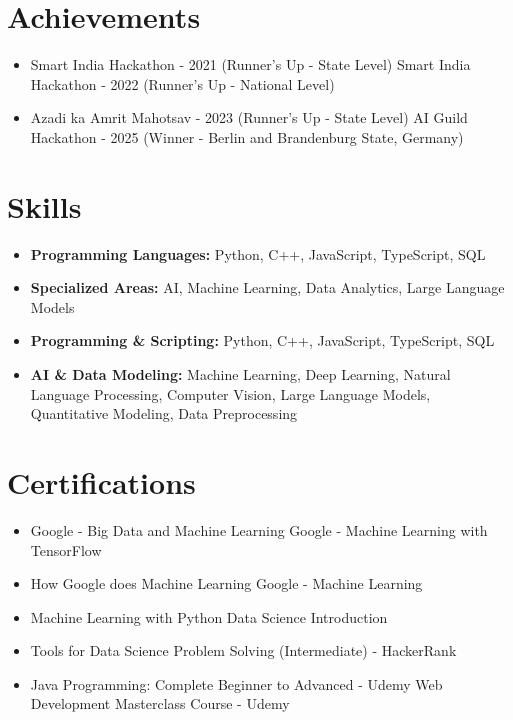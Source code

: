 \documentclass[a4paper,10pt]{article}
\begin{document}
\section*{Achievements}
\begin{itemize}
\item Smart India Hackathon - 2021 (Runner's Up - State Level) \hfill Smart India Hackathon - 2022 (Runner's Up - National Level)
\item Azadi ka Amrit Mahotsav - 2023 (Runner's Up - State Level) \hfill AI Guild Hackathon - 2025 (Winner - Berlin and Brandenburg State, Germany)
\end{itemize}

\section*{Skills}
\begin{itemize}
  \item \textbf{Programming Languages:} Python, C++, JavaScript, TypeScript, SQL
  \item \textbf{Specialized Areas:} AI, Machine Learning, Data Analytics, Large Language Models
  \item \textbf{Programming \& Scripting:} Python, C++, JavaScript, TypeScript, SQL
  \item \textbf{AI \& Data Modeling:} Machine Learning, Deep Learning, Natural Language Processing, Computer Vision, Large Language Models, Quantitative Modeling, Data Preprocessing
\end{itemize}

\section*{Certifications}
\begin{itemize}
\item Google - Big Data and Machine Learning \hfill Google - Machine Learning with TensorFlow
\item How Google does Machine Learning \hfill Google - Machine Learning
\item Machine Learning with Python \hfill Data Science Introduction
\item Tools for Data Science \hfill Problem Solving (Intermediate) - HackerRank
\item Java Programming: Complete Beginner to Advanced - Udemy \hfill Web Development Masterclass Course - Udemy
\end{itemize}
\end{document}

